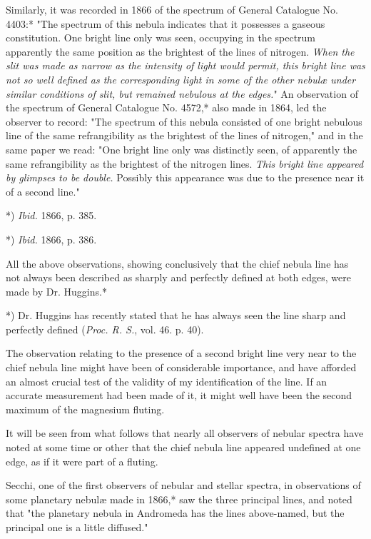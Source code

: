 \documentclass[a4paper, 12pt, oneside, polutonikogreek, english]{article}
\begin{document}
Similarly, it was recorded in 1866 of the spectrum of General Catalogue No. 4403:* "The spectrum of this nebula indicates that it possesses a gaseous constitution. One bright line only was seen, occupying in the spectrum apparently the same position as the brightest of the lines of nitrogen. \emph{When the slit was made as narrow as the intensity of light would permit, this bright line was not so well defined as the corresponding light in some of the other nebulæ under similar conditions of slit, but remained nebulous at the edges.}" An observation of the spectrum of General Catalogue No. 4572,* also made in 1864, led the observer to record: "The spectrum of this nebula consisted of one bright nebulous line of the same refrangibility as the brightest of the lines of nitrogen," and in the same paper we read: "One bright line only was distinctly seen, of apparently the same refrangibility as the brightest of the nitrogen lines. \emph{This bright line appeared by glimpses to be double.} Possibly this appearance was due to the presence near it of a second line."

*) \emph{Ibid.} 1866, p. 385.

*) \emph{Ibid.} 1866, p. 386.

All the above observations, showing conclusively that the chief nebula line has not always been described as sharply and perfectly defined at both edges, were made by Dr. Huggins.*

*) Dr. Huggins has recently stated that he has always seen the line sharp and perfectly defined (\emph{Proc. R. S.}, vol. 46. p. 40).

The observation relating to the presence of a second bright line very near to the chief nebula line might have been of considerable importance, and have afforded an almost crucial test of the validity of my identification of the line. If an accurate measurement had been made of it, it might well have been the second maximum of the magnesium fluting.

It will be seen from what follows that nearly all observers of nebular spectra have noted at some time or other that the chief nebula line appeared undefined at one edge, as if it were part of a fluting.

Secchi, one of the first observers of nebular and stellar spectra, in observations of some planetary nebulæ made in 1866,* saw the three principal lines, and noted that "the planetary nebula in Andromeda has the lines above-named, but the principal one is a little diffused."
\end{document}
